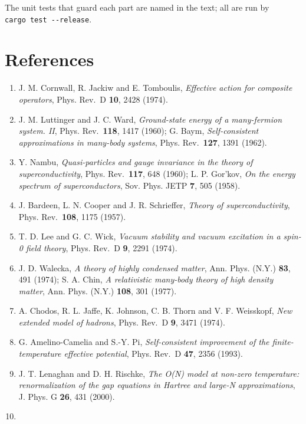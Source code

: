 \documentclass[
  10pt,
]{article}
\providecommand{\tightlist}{%
  \setlength{\itemsep}{0pt}\setlength{\parskip}{0pt}}
\begin{document}
The unit tests that guard each part are named in the text; all are run
by \texttt{cargo\ test\ -\/-release}.

\hypertarget{references}{%
\section{References}\label{references}}

\begin{enumerate}
\def\labelenumi{\arabic{enumi}.}
\tightlist
\item
  J. M. Cornwall, R. Jackiw and E. Tomboulis, \emph{Effective action for
  composite operators}, Phys. Rev.~D \textbf{10}, 2428 (1974).
\item
  J. M. Luttinger and J. C. Ward, \emph{Ground-state energy of a
  many-fermion system. II}, Phys. Rev.~\textbf{118}, 1417 (1960); G.
  Baym, \emph{Self-consistent approximations in many-body systems},
  Phys. Rev.~\textbf{127}, 1391 (1962).
\item
  Y. Nambu, \emph{Quasi-particles and gauge invariance in the theory of
  superconductivity}, Phys. Rev.~\textbf{117}, 648 (1960); L. P.
  Gor'kov, \emph{On the energy spectrum of superconductors}, Sov. Phys.
  JETP \textbf{7}, 505 (1958).
\item
  J. Bardeen, L. N. Cooper and J. R. Schrieffer, \emph{Theory of
  superconductivity}, Phys. Rev.~\textbf{108}, 1175 (1957).
\item
  T. D. Lee and G. C. Wick, \emph{Vacuum stability and vacuum excitation
  in a spin-0 field theory}, Phys. Rev.~D \textbf{9}, 2291 (1974).
\item
  J. D. Walecka, \emph{A theory of highly condensed matter}, Ann. Phys.
  (N.Y.) \textbf{83}, 491 (1974); S. A. Chin, \emph{A relativistic
  many-body theory of high density matter}, Ann. Phys. (N.Y.)
  \textbf{108}, 301 (1977).
\item
  A. Chodos, R. L. Jaffe, K. Johnson, C. B. Thorn and V. F. Weisskopf,
  \emph{New extended model of hadrons}, Phys. Rev.~D \textbf{9}, 3471
  (1974).
\item
  G. Amelino-Camelia and S.-Y. Pi, \emph{Self-consistent improvement of
  the finite-temperature effective potential}, Phys. Rev.~D \textbf{47},
  2356 (1993).
\item
  J. T. Lenaghan and D. H. Rischke, \emph{The O(N) model at non-zero
  temperature: renormalization of the gap equations in Hartree and
  large-N approximations}, J. Phys. G \textbf{26}, 431 (2000).
\item

\end{enumerate}
\end{document}
